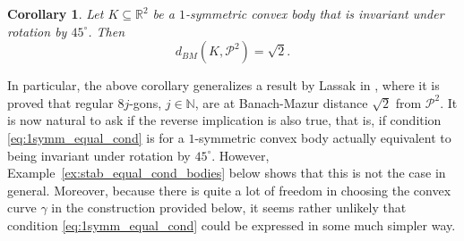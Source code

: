 \documentclass[12pt,a4paper]{article}
\newtheorem{cor}[twr]{Corollary}
\theoremstyle{definition}
\newcommand\R{\mathbb{R}}
\newcommand\N{\mathbb{N}}
\newcommand\CP{\mathcal{P}}
\begin{document}
\begin{cor}
Let $K \subseteq \R^2$ be a $1$-symmetric convex body that is invariant under rotation by $45^\circ$. Then
$$ d_{BM}(K,\CP^2) = \sqrt{2}. $$
\end{cor}



In particular, the above corollary generalizes a result by Lassak in \cite{lassak}, where it is proved that regular $8j$-gons, $j \in \N$, are at Banach-Mazur distance $\sqrt{2}$ from $\CP^2$. It is now natural to ask if the reverse implication is also true, that is, if condition \eqref{eq:1symm_equal_cond} is for a $1$-symmetric convex body actually equivalent to being invariant under rotation by $45^\circ$. However, Example~\ref{ex:stab_equal_cond_bodies} below shows that this is not the case in general. Moreover, because there is quite a lot of freedom in choosing the convex curve $\gamma$ in the construction provided below, it seems rather unlikely that condition \eqref{eq:1symm_equal_cond} could be expressed in some much simpler way.
\end{document}
